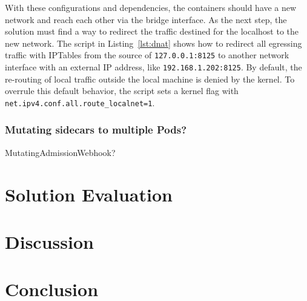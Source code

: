 \documentclass[english, 12pt, a4paper, sci, utf8, a-2b, online]{aaltothesis}
\begin{document}

With these configurations and dependencies, the containers should have a new network and reach each other via the bridge interface.
As the next step, the solution must find a way to redirect the traffic destined for the localhost to the new network.
The script in Listing~\ref{lst:dnat} shows how to redirect all egressing traffic with IPTables from the source of \texttt{127.0.0.1:8125} to another network interface with an external IP address, like \texttt{192.168.1.202:8125}.
By default, the re-routing of local traffic outside the local machine is denied by the kernel.
To overrule this default behavior, the script sets a kernel flag with \lstinline{net.ipv4.conf.all.route_localnet=1}.



\subsubsection{Mutating sidecars to multiple Pods?}

MutatingAdmissionWebhook?

\clearpage

\section{Solution Evaluation} \label{sec:solution}

\clearpage

\section{Discussion} \label{sec:discussion}

\clearpage

\section{Conclusion} \label{sec:conclusion}

\clearpage

\thesisbibliography
\printbibliography

\clearpage
\end{document}
